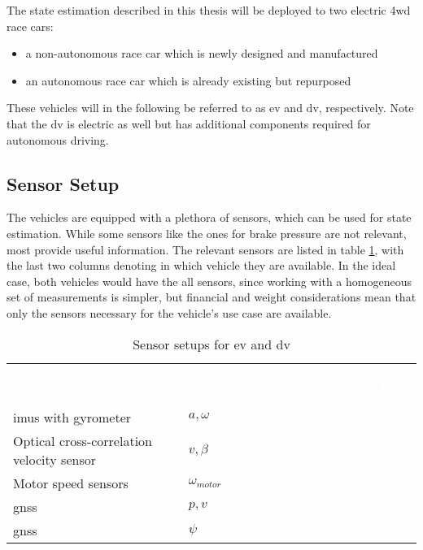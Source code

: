 The state estimation described in this thesis will be deployed to two electric \gls{4wd} race cars:
\begin{itemize}
\item a non-autonomous race car which is newly designed and manufactured
\item an autonomous race car which is already existing but repurposed
\end{itemize}
These vehicles will in the following be referred to as \gls{ev} and \gls{dv}, respectively. Note that the \gls{dv} is electric as well but has additional components required for autonomous driving.

\subsection{Sensor Setup}
The vehicles are equipped with a plethora of sensors, which can be used for state estimation. While some sensors like the ones for brake pressure are not relevant, most provide useful information. The relevant sensors are listed in table \ref{tab:sensor}, with the last two columns denoting in which vehicle they are available. In the ideal case, both vehicles would have the all sensors, since working with a homogeneous set of measurements is simpler, but financial and weight considerations mean that only the sensors necessary for the vehicle's use case are available.

\begin{table}
	\newcommand\heading[1]{\textcolor{white}{\textbf{#1}}}
	\renewcommand{\arraystretch}{1.2}
	\sffamily
	\centering
	\begin{tabularx}{\textwidth}{X l c c}
	\rowcolor{black} \heading{Sensor type} & \heading{Measured variables~~~} & \heading{~EV~} & \heading{~DV~} \vspace{2pt} \\
	\Glsdesc{imu}s with gyrometer & $a, \omega$ & \xmark & \xmark \\
	Optical cross-correlation velocity sensor & $v, \beta$ & \xmark &  \\
	Motor speed sensors & $\omega_{motor}$ & \xmark & \xmark \\
	\Glsdesc{gnss} & $p, v$ & \xmark & \xmark \\
	\Glsdesc{gnss} & $\psi$ &  & \xmark \\
	\end{tabularx}
	\caption{Sensor setups for \gls{ev} and \gls{dv}}
	\label{tab:sensor}
\end{table}

